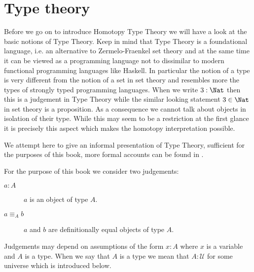{%

\newcommand{\stype}{{\;\sf type}}
\newcommand{\rec}{{\sf rec}}
\newcommand{\bool}{{\bf B}}
\newcommand{\app}{{\sf app}}
\newcommand{\pair}{{\sf pair}}
\newcommand{\inleft}{{\sf inleft}}
\newcommand{\inright}{{\sf inright}}
\newcommand{\emptyt}{{\bf 0}}
\newcommand{\unitt}{{\bf 1}}
\newcommand{\UU}{{\mathcal U}}

\chapter{Type theory}
\label{cha:typetheory}

Before we go on to introduce Homotopy Type Theory we will have a look at
the basic notions of Type Theory. Keep in mind that Type Theory is a
foundational language, i.e. an alternative to Zermelo-Fraenkel set theory
and at the same time it can be viewed as a programming language not to
dissimilar to modern functional programming languages like Haskell. In
particular the notion of a type is very different from the notion of a
set in set theory and resembles more the types of strongly typed
programming languages. When we write $3 : \Nat$ then this is a
judgement in Type Theory while the similar looking statement $3 \in
\Nat$ in set theory is a proposition. As a consequence we cannot talk
about objects in isolation of their type. While this may seem to be a
restriction at the first glance it is precisely this aspect which
makes the homotopy interpretation possible.

We attempt here to give an informal presentation of Type Theory,
sufficient for the purposes of this book, more formal accounts can be
found in \cite{hofmann-traktat,...}.

For the purpose of this book we consider two judgements:
\begin{description}
\item[$a : A$] $a$ is an object of type $A$.
\item[$a \equiv_A b$] $a$ and $b$ are definitionally equal 
  objects of type $A$.
\end{description}
Judgements may depend on assumptions of the form $x:A$ where $x$ is a
variable and $A$ is a type. When we say that $A$ is a type we mean
that $A : \UU$ for some universe which is introduced below.

}
